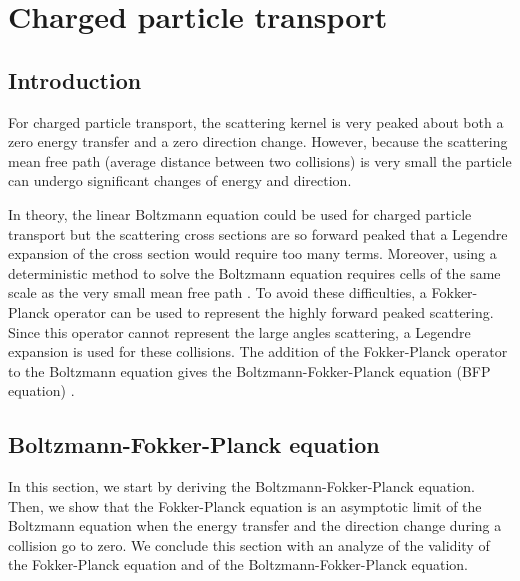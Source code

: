 \chapter{Charged particle transport}
\section{Introduction}
For charged particle transport, the scattering kernel is very peaked about both
a zero energy transfer and a zero direction change. However, because the
scattering mean free path (average distance between two collisions) is very
small the particle can undergo significant changes of energy and direction.

In theory, the linear Boltzmann equation could be used for charged particle
transport but the scattering cross sections are so forward peaked that a Legendre 
expansion of the cross section would require too many terms. Moreover, using a
deterministic method to solve the Boltzmann equation requires cells of
the same scale as the very small mean free path \cite{pomraning}. 
To avoid these difficulties, a Fokker-Planck operator can
be used to represent the highly forward peaked scattering. Since this operator 
cannot represent the large angles scattering, a Legendre expansion is used for
these collisions. The addition of the Fokker-Planck operator to the Boltzmann
equation gives the Boltzmann-Fokker-Planck equation (BFP equation) \cite{ligou}.

\section{Boltzmann-Fokker-Planck equation}
In this section, we start by deriving the Boltzmann-Fokker-Planck equation.
Then, we show that the Fokker-Planck equation is an asymptotic limit of the Boltzmann
equation when the energy transfer and the direction change during a collision go 
to zero. We conclude this section with an analyze of the validity of the Fokker-Planck
equation and of the Boltzmann-Fokker-Planck equation.
